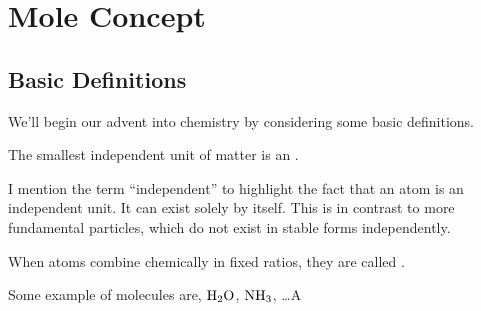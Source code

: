 \chapter{Mole Concept}

\section{Basic Definitions}

We'll begin our advent into chemistry by considering some basic definitions.


\begin{definition}
    The smallest independent unit of matter is an .
\end{definition}

I mention the term ``independent'' to highlight the fact that an atom is an independent unit. It can exist solely by itself. This is in contrast to 
more fundamental particles, which do not exist in stable forms independently.  

\begin{definition}
    When atoms combine chemically in fixed ratios, they are called .
\end{definition}

Some example of molecules are, \(\ce{H2O}\), \(\ce{NH3}\), \dots A 